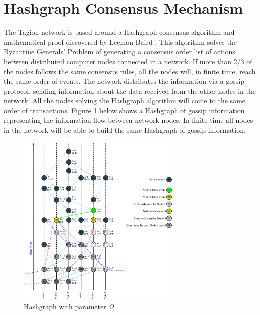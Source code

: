 \section{Hashgraph Consensus Mechanism} \label{sec:hashgraph_cm}
The Tagion network is based around a Hashgraph consensus algorithm and mathematical proof discovered by Leemon Baird \cite{SWIRLDS_HASHGRAPH}. This algorithm solves the Byzantine Generals’ Problem of generating a consensus order list of actions between distributed computer nodes connected in a network.
If more than 2/3 of the nodes follows the same consensus rules, all the nodes will, in finite time, reach the same order of events.
The network distributes the information via a gossip protocol, sending information about the data received from the other nodes in the network. All the nodes solving the Hashgraph algorithm will come to the same order of transactions.
Figure 1 below shows a Hashgraph of gossip information representing the information flow between network nodes. In finite time all nodes in the network will be able to build the same Hashgraph of gossip information.


\begin{figure}[ht]
 \centering
 \includegraphics[width=0.7\textwidth]{fig/wavefront_and_order_long.eps}
 \caption{Hashgraph with parameter $\Omega$}
 \label{fig:wavefront}
\end{figure}

